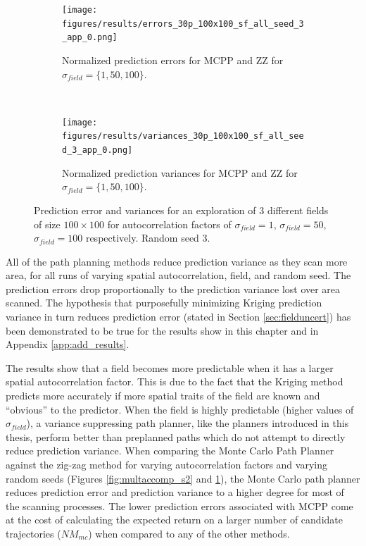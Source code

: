 \begin{figure}[htb!]
    \centering
    \begin{subfigure}[t]{0.75\textwidth}
        \centering
        \texttt{[image: figures/results/errors\_30p\_100x100\_sf\_all\_seed\_3\_app\_0.png]}
        \captionsetup{skip=0.20\baselineskip,size=footnotesize}
        \caption{Normalized prediction errors for MCPP and ZZ for $\sigma_{field} = \{1, 50, 100\}$.}
    \end{subfigure}%
    \\
    \begin{subfigure}[t]{0.75\textwidth}
        \centering
        \texttt{[image: figures/results/variances\_30p\_100x100\_sf\_all\_seed\_3\_app\_0.png]}
        \captionsetup{skip=0.20\baselineskip,size=footnotesize}
        \caption{Normalized prediction variances for MCPP and ZZ for $\sigma_{field} = \{1, 50, 100\}$.}
    \end{subfigure}%
    \ssp
    \captionsetup{skip=0.20\baselineskip}
    \caption{Prediction error and variances for an exploration of $3$ different fields of size $100 \times 100$ for autocorrelation factors of $\sigma_{field} = 1$, $\sigma_{field} = 50$, $\sigma_{field} = 100$ respectively. Random seed 3.}
    \label{fig:multaccomp_s3}
\end{figure}
\FloatBarrier

All of the path planning methods reduce prediction variance as they scan more area, for all runs of varying spatial autocorrelation, field, and random seed. The prediction errors drop proportionally to the prediction variance lost over area scanned. The hypothesis that purposefully minimizing Kriging prediction variance in turn reduces prediction error (stated in Section \ref{sec:fielduncert}) has been demonstrated to be true for the results show in this chapter and in Appendix \ref{app:add_results}. 

The results show that a field becomes more predictable when it has a larger spatial autocorrelation factor. This is due to the fact that the Kriging method predicts more accurately if more spatial traits of the field are known and ``obvious'' to the predictor. When the field is highly predictable (higher values of $\sigma_{field}$), a variance suppressing path planner, like the planners introduced in this thesis, perform better than preplanned paths which do not attempt to directly reduce prediction variance. When comparing the Monte Carlo Path Planner against the zig-zag method for varying autocorrelation factors and varying random seeds (Figures \ref{fig:multaccomp_s2} and \ref{fig:multaccomp_s3}), the Monte Carlo path planner reduces prediction error and prediction variance to a higher degree for most of the scanning processes. The lower prediction errors associated with MCPP come at the cost of calculating the expected return on a larger number of candidate trajectories ($NM_{mc}$) when compared to any of the other methods. 

